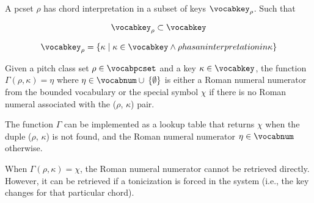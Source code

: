 
A \gls{pcset} $\rho$ has chord interpretation in a subset of
keys $\vocabkey_{\rho}$. Such that

\begin{equation}
    \vocabkey_{\rho} \subset \vocabkey
\end{equation}

\begin{equation}
    \vocabkey_{\rho} = \{\kappa \mid \kappa \in \vocabkey \land \rho has an interpretation in \kappa\}
\end{equation}



Given a pitch class set $\rho \in \vocabpcset$ and a key
$\kappa \in \vocabkey$, the function $\Gamma(\rho, \kappa) =
\eta$ where $\eta \in \vocabnum \cup \: \{ \emptyset \}$ is
either a Roman numeral numerator from the bounded vocabulary
or the special symbol $\chi$ if there is no Roman numeral
associated with the ($\rho$, $\kappa$) pair.

The function $\Gamma$ can be implemented as a lookup table
that returns $\chi$ when the duple ($\rho$, $\kappa$) is not
found, and the Roman numeral numerator $\eta \in \vocabnum$
otherwise.

When $\Gamma(\rho, \kappa) = \chi$, the Roman numeral
numerator cannot be retrieved directly. However, it can be
retrieved if a tonicization is forced in the system (i.e.,
the key changes for that particular chord).


